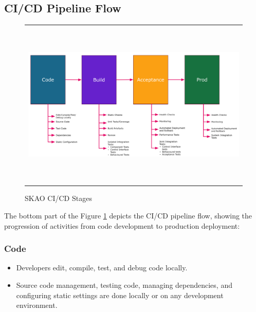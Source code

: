 \documentclass[a4paper]{spie}  %
\begin{document}
\subsection*{CI/CD Pipeline Flow}

   \begin{figure} [ht]
   \begin{center}
   \begin{tabular}{c} %
   \includegraphics[height=8cm]{stages.png}
   \end{tabular}
   \end{center}
   \caption 
   { \label{fig:stages}
SKAO CI/CD Stages }
    \end{figure} 

The bottom part of the Figure \ref{fig:stages} depicts the CI/CD pipeline flow, showing the progression of activities from code development to production deployment:

\subsubsection*{Code}

\begin{itemize}
    \item Developers edit, compile, test, and debug code locally.
    \item Source code management, testing code, managing dependencies, and configuring static settings are done locally or on any development environment.
\end{itemize}
\end{document}
